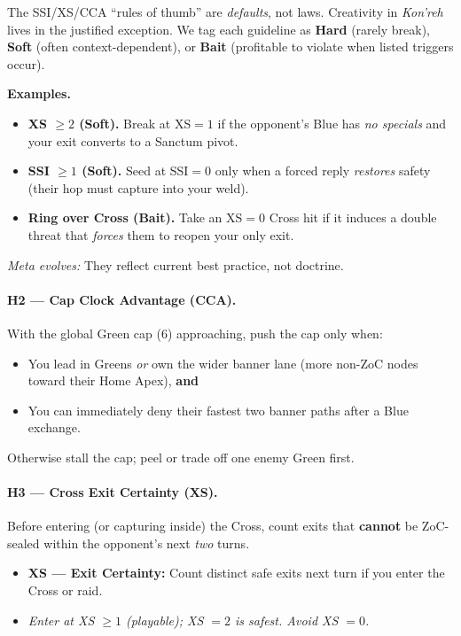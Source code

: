 \documentclass[11pt]{article}
\begin{document}
\begin{tcolorbox}[enhanced,breakable,title={Designer Note — Heuristics Are Handles, Not Handcuffs},
  colback=white,colframe=royal,boxrule=0.8pt]
\small
The SSI/XS/CCA “rules of thumb” are \emph{defaults}, not laws. Creativity in \textit{Kon'reh} lives in the justified exception.
We tag each guideline as \textbf{Hard} (rarely break), \textbf{Soft} (often context-dependent), or \textbf{Bait} (profitable to violate when listed triggers occur).

\textbf{Examples.}
\begin{itemize}[leftmargin=1.2em,itemsep=0.2em]
  \item \textbf{XS $\ge 2$ (Soft).} Break at XS$=1$ if the opponent’s Blue has \emph{no specials} and your exit converts to a Sanctum pivot.
  \item \textbf{SSI $\ge 1$ (Soft).} Seed at SSI$=0$ only when a forced reply \emph{restores} safety (their hop must capture into your weld).
  \item \textbf{Ring over Cross (Bait).} Take an XS$=0$ Cross hit if it induces a double threat that \emph{forces} them to reopen your only exit.
\end{itemize}
\emph{Meta evolves:} They reflect current best practice, not doctrine.
\end{tcolorbox}

\paragraph{H2 — Cap Clock Advantage (CCA).}
With the global Green cap (6) approaching, push the cap only when:
\begin{itemize}
  \item You lead in Greens \emph{or} own the wider banner lane (more non-ZoC nodes toward their Home Apex), \textbf{and}
  \item You can immediately deny their fastest two banner paths after a Blue exchange.
\end{itemize}
Otherwise stall the cap; peel or trade off one enemy Green first.

\paragraph{H3 — Cross Exit Certainty (XS).}
Before entering (or capturing inside) the Cross, count exits that \textbf{cannot} be ZoC-sealed within the opponent’s next \emph{two} turns.
\begin{itemize}
  \item \textbf{XS — Exit Certainty:} Count distinct safe exits next turn if you enter the Cross or raid. 
  \item \emph{Enter at XS $\ge 1$ (playable); XS $=2$ is safest. Avoid XS $=0$.}
\end{itemize}
\end{document}
